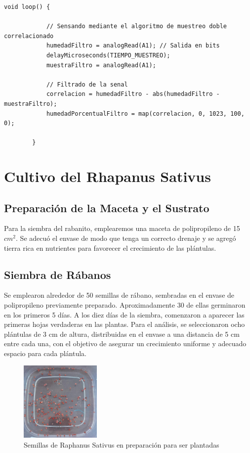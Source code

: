 \documentclass[conference]{IEEEtran}
\begin{document}
	\begin{lstlisting}[caption=Arduino Muestreo doble Correlacionado, numbers=none, label=cd:mdc-modificado]
		void loop() {
			
			// Sensando mediante el algoritmo de muestreo doble correlacionado
			humedadFiltro = analogRead(A1); // Salida en bits
			delayMicroseconds(TIEMPO_MUESTREO);
			muestraFiltro = analogRead(A1);
			
			// Filtrado de la senal
			correlacion = humedadFiltro - abs(humedadFiltro - muestraFiltro);
			humedadPorcentualFiltro = map(correlacion, 0, 1023, 100, 0);
			
		}
	\end{lstlisting}
	
	\section{Cultivo del Rhapanus Sativus}
	\subsection{Preparación de la Maceta y el Sustrato}
	Para la siembra del rabanito, emplearemos una maceta de polipropileno de 15 $cm^2$. Se adecuó el envase de modo que tenga un correcto drenaje y se agregó tierra rica en nutrientes para favorecer el crecimiento de las plántulas.
	\subsection{ Siembra de Rábanos}
	Se emplearon alrededor de 50 semillas de rábano, sembradas en el envase de polipropileno previamente preparado. Aproximadamente 30 de ellas germinaron en los primeros 5 días. A los diez días de la siembra, comenzaron a aparecer las primeras hojas verdaderas en las plantas.
	Para el análisis, se seleccionaron ocho plántulas de 3 cm de altura, distribuidas en el envase a una distancia de 5 cm entre cada una, con el objetivo de asegurar un crecimiento uniforme y adecuado espacio para cada plántula.
	
	\begin{figure}[h]
		\centering
		\includegraphics[width=0.35\textwidth]{media/Semillas.jpg}
		\caption{Semillas de Raphanus Sativus en preparación para ser plantadas}
		\label{fig:raphanus-semillas}
	\end{figure}
	
\end{document}
